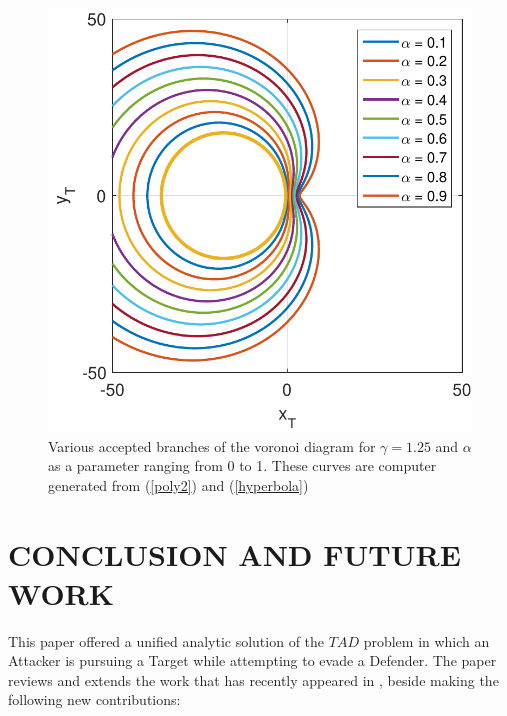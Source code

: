 \documentclass[final,5p,times,twocolumn]{elsarticle}
\begin{document}
\begin{figure}[htb]
\centering
\includegraphics[width=0.75\columnwidth]{VAR_alpha_g_1p25.pdf}
\caption{Various accepted branches of the voronoi diagram for $\gamma=1.25$ and $\alpha$ as a parameter ranging from 0 to 1. These curves are computer generated from (\ref{poly2}) and (\ref{hyperbola})}
\label{VAR_alpha_gamma=1.25}
\end{figure}

\section{CONCLUSION AND FUTURE WORK}
This paper offered a unified analytic solution of the $TAD$ problem in which an Attacker is pursuing a Target while attempting to evade a Defender. The paper reviews and extends the work that has recently appeared in \cite{pachter2014active,garcia2015active,garcia2015escape}, beside making the following new contributions:
\end{document}
